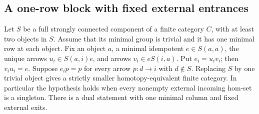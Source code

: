 \subsection{A one-row block with fixed external entrances}

\begin{lemma}\label{C:one-row-fixed-entrance-collapse}
Let $S$ be a full strongly connected component of a finite
category $C$, with at least two objects in $S$. Assume that its minimal group is trivial and
it has one minimal row at each object. Fix an object $a$,
a minimal idempotent $e\in S(a,a)$, the unique arrows
$u_i\in S(a,i)e$, and arrows $v_i\in eS(i,a)$.
Put $e_i=u_iv_i$; then $v_iu_i=e$.
Suppose $e_i p=p$ for every arrow $p:d\to i$ with
$d\notin S$. Replacing $S$ by one trivial object gives
a strictly smaller homotopy-equivalent finite category.
In particular the hypothesis holds when every nonempty
external incoming hom-set is a singleton. There is a dual
statement with one minimal column and fixed external exits.
\end{lemma}
